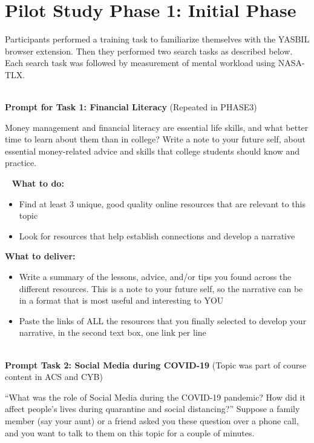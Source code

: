 \documentclass[letterpaper, nobind]{templates/ociamthesis}
\begin{document}
\hypertarget{pilot-study-phase-1-initial-phase}{%
\section{Pilot Study Phase 1: Initial Phase}\label{pilot-study-phase-1-initial-phase}}

Participants performed a training task to familiarize themselves with
the YASBIL browser extension. Then they performed two search tasks as
described below. Each search task was followed by measurement of mental
workload using NASA-TLX.

~\\
\textbf{Prompt for Task 1: Financial Literacy} (Repeated in PHASE3)

Money management and financial literacy are essential life skills, and
what better time to learn about them than in college? Write a note to
your future self, about essential money-related advice and skills that
college students should know and practice.

~
\textbf{What to do:}

\begin{itemize}
\item
  Find at least 3 unique, good quality online resources that are
  relevant to this topic
\item
  Look for resources that help establish connections and develop a
  narrative
\end{itemize}

\textbf{What to deliver:}

\begin{itemize}
\item
  Write a summary of the lessons, advice, and/or tips you found across
  the different resources. This is a note to your future self, so the
  narrative can be in a format that is most useful and interesting to
  YOU
\item
  Paste the links of ALL the resources that you finally selected to
  develop your narrative, in the second text box, one link per line
\end{itemize}

~\\
\textbf{Prompt Task 2: Social Media during COVID-19} (Topic was part of course
content in ACS and CYB)

``What was the role of Social Media during the COVID-19 pandemic? How did
it affect people's lives during quarantine and social distancing?''
Suppose a family member (say your aunt) or a friend asked you these
question over a phone call, and you want to talk to them on this topic
for a couple of minutes.
\end{document}

